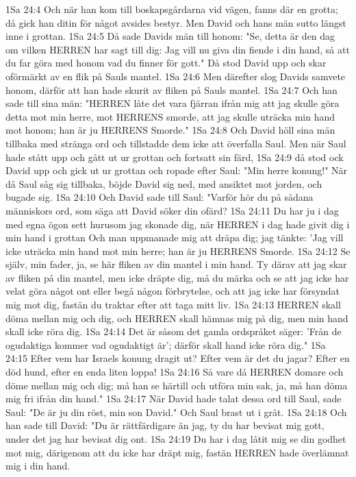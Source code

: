 1Sa 24:4  Och när han kom till boskapsgårdarna vid vägen, fanns där en grotta; då gick han ditin för något avsides bestyr. Men David och hans män sutto längst inne i grottan.
1Sa 24:5  Då sade Davids män till honom: "Se, detta är den dag om vilken HERREN har sagt till dig: Jag vill nu giva din fiende i din hand, så att du far göra med honom vad du finner för gott." Då stod David upp och skar oförmärkt av en flik på Sauls mantel.
1Sa 24:6  Men därefter slog Davids samvete honom, därför att han hade skurit av fliken på Sauls mantel.
1Sa 24:7  Och han sade till sina män: "HERREN låte det vara fjärran ifrån mig att jag skulle göra detta mot min herre, mot HERRENS smorde, att jag skulle uträcka min hand mot honom; han är ju HERRENS Smorde."
1Sa 24:8  Och David höll sina män tillbaka med stränga ord och tillstadde dem icke att överfalla Saul. Men när Saul hade stått upp och gått ut ur grottan och fortsatt sin färd,
1Sa 24:9  då stod ock David upp och gick ut ur grottan och ropade efter Saul: "Min herre konung!" När då Saul såg sig tillbaka, böjde David sig ned, med ansiktet mot jorden, och bugade sig.
1Sa 24:10  Och David sade till Saul: "Varför hör du på sådana människors ord, som säga att David söker din ofärd?
1Sa 24:11  Du har ju i dag med egna ögon sett hurusom jag skonade dig, när HERREN i dag hade givit dig i min hand i grottan Och man uppmanade mig att dräpa dig; jag tänkte: 'Jag vill icke uträcka min hand mot min herre; han är ju HERRENS Smorde.
1Sa 24:12  Se själv, min fader, ja, se här fliken av din mantel i min hand. Ty därav att jag skar av fliken på din mantel, men icke dräpte dig, må du märka och se att jag icke har velat göra något ont eller begå någon förbrytelse, och att jag icke har försyndat mig mot dig, fastän du traktar efter att taga mitt liv.
1Sa 24:13  HERREN skall döma mellan mig och dig, och HERREN skall hämnas mig på dig, men min hand skall icke röra dig.
1Sa 24:14  Det är såsom det gamla ordspråket säger: 'Från de ogudaktiga kommer vad ogudaktigt är'; därför skall hand icke röra dig."
1Sa 24:15  Efter vem har Israels konung dragit ut? Efter vem är det du jagar? Efter en död hund, efter en enda liten loppa!
1Sa 24:16  Så vare då HERREN domare och döme mellan mig och dig; må han se härtill och utföra min sak, ja, må han döma mig fri ifrån din hand."
1Sa 24:17  När David hade talat dessa ord till Saul, sade Saul: "De är ju din röst, min son David." Och Saul brast ut i gråt.
1Sa 24:18  Och han sade till David: "Du är rättfärdigare än jag, ty du har bevisat mig gott, under det jag har bevisat dig ont.
1Sa 24:19  Du har i dag låtit mig se din godhet mot mig, därigenom att du icke har dräpt mig, fastän HERREN hade överlämnat mig i din hand.
